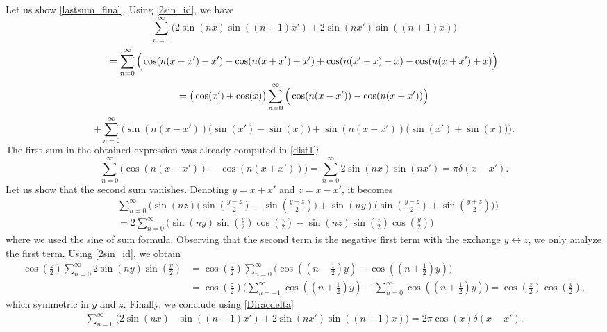 \documentclass[11pt]{amsart}
\theoremstyle{definition}
\theoremstyle{remark}
\theoremstyle{plain}
\numberwithin{equation}{section}
\numberwithin{lemma}{section}
\numberwithin{definition}{section}
\numberwithin{proposition}{section}
\numberwithin{corollary}{section}
\numberwithin{theorem}{section}
\numberwithin{remark}{section}
\begin{document}
Let us show \eqref{lastsum_final}. Using \eqref{2sin_id}, we have
\begin{equation}
  \sum_{n=0}^\infty \Big( 2\sin(nx)\sin((n+1)x') + 2\sin(nx')\sin((n+1)x) \Big) \label{lastsum_expr}
 \end{equation} 
 \begin{equation*}
  =  \sum_{n=0}^\infty \Big( \cos(n(x-x')-x')-\cos(n(x+x')+x') + \cos(n(x'-x)-x)-\cos(n(x+x')+x) \Big) \notag 
   \end{equation*} 
 \begin{equation*}
  =  \big(\cos(x')+\cos(x)\big) \sum_{n=0}^\infty \Big( \cos(n(x-x'))-\cos(n(x+x'))\Big) \notag 
   \end{equation*} 
 \begin{equation*}
  +  \sum_{n=0}^\infty \Big(\sin(n(x-x'))\big(\sin(x')-\sin(x) \big) +\sin(n(x+x'))\big(\sin(x')+\sin(x)\big) \Big) \label{lastsum}. 
\end{equation*}
The first sum in the obtained expression was already computed in \eqref{dist1}:
\begin{equation} \label{last_first_sum}
 \sum_{n=0}^\infty \Big( \cos(n(x-x'))-\cos(n(x+x')) \Big)= \sum_{n=0}^\infty 2\sin(nx)\sin(nx')=\pi \delta(x-x').
\end{equation}
Let us show that the second sum vanishes. Denoting $y=x+x'$ and $z=x-x'$, it becomes
\begin{align*}
& \sum_{n=0}^\infty \Big(\sin(nz)\big(\sin(\frac{y-z}{2})-\sin(\frac{y+z}{2}) \big) +\sin(ny)\big(\sin(\frac{y-z}{2})+\sin(\frac{y+z}{2})\big) \Big) \\
&= 2\sum_{n=0}^\infty \Big( \sin(ny) \sin(\frac y2)\cos(\frac z2) - \sin(nz)\sin(\frac z2)\cos(\frac y2) \Big)
\end{align*} 
where we used the sine of sum formula. Observing that the second term is the negative first term with the exchange $y\leftrightarrow z$, we only analyze the first term. Using \eqref{2sin_id}, we obtain
\begin{align*}
 \cos(\frac z2) \sum_{n=0}^\infty 2\sin(ny) \sin(\frac y2) &=\cos(\frac z2) \sum_{n=0}^\infty \Big( \cos((n-\frac12)y)- \cos((n+\frac12)y) \Big)\\
 &= \cos(\frac z2) \Big( \sum_{n=-1}^\infty \cos((n+\frac12)y)-\sum_{n=0}^\infty \cos((n+\frac12)y) \Big)=\cos(\frac z2)\cos(\frac y2),
\end{align*}
which symmetric in $y$ and $z$.
Finally, we conclude using \eqref{Diracdelta}
\begin{align*}
  \sum_{n=0}^\infty \Big( 2\sin(nx) & \sin((n+1)x') + 2\sin(nx')\sin((n+1)x) \Big) =2\pi \cos(x) \delta(x-x').
\end{align*}
\end{document}
